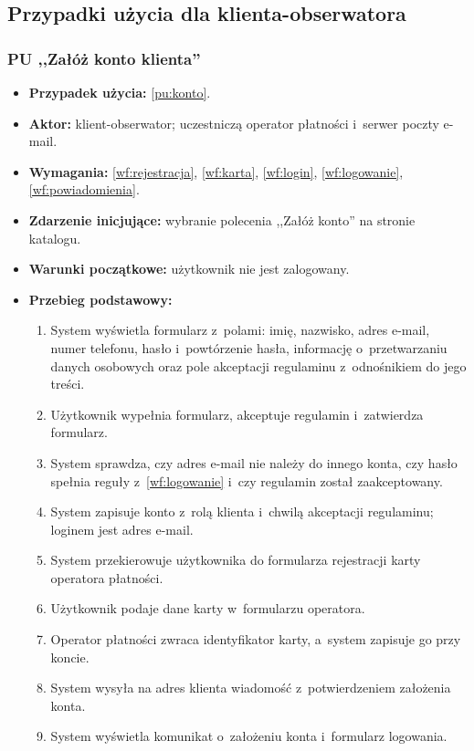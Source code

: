 \documentclass[12pt,a4paper,oneside]{article}
\newcounter{pu}
\begin{document}
\subsection{Przypadki użycia dla klienta-obserwatora}
\label{sec:pu-obserwator}

\subsubsection{PU ,,Załóż konto klienta''}
\label{sec:pu-konto}

\begin{itemize}
	\item \textbf{Przypadek użycia:} \ref{pu:konto}.
	\item \textbf{Aktor:} klient-obserwator; uczestniczą operator płatności i~serwer poczty e-mail.
	\item \textbf{Wymagania:} \ref{wf:rejestracja}, \ref{wf:karta}, \ref{wf:login}, \ref{wf:logowanie}, \ref{wf:powiadomienia}.
	\item \textbf{Zdarzenie inicjujące:} wybranie polecenia ,,Załóż konto'' na stronie katalogu.
	\item \textbf{Warunki początkowe:} użytkownik nie jest zalogowany.
	\item \textbf{Przebieg podstawowy:}
	\begin{enumerate}
		\item System wyświetla formularz z~polami: imię, nazwisko, adres e-mail, numer telefonu, hasło i~powtórzenie hasła, informację o~przetwarzaniu danych osobowych oraz pole akceptacji regulaminu z~odnośnikiem do jego treści.
		\item Użytkownik wypełnia formularz, akceptuje regulamin i~zatwierdza formularz.
		\item System sprawdza, czy adres e-mail nie należy do innego konta, czy hasło spełnia reguły z~\ref{wf:logowanie} i~czy regulamin został zaakceptowany.
		\item System zapisuje konto z~rolą klienta i~chwilą akceptacji regulaminu; loginem jest adres e-mail.
		\item System przekierowuje użytkownika do formularza rejestracji karty operatora płatności.
		\item Użytkownik podaje dane karty w~formularzu operatora.
		\item Operator płatności zwraca identyfikator karty, a~system zapisuje go przy koncie.
		\item System wysyła na adres klienta wiadomość z~potwierdzeniem założenia konta.
		\item System wyświetla komunikat o~założeniu konta i~formularz logowania.

\end{enumerate}
\end{itemize}
\end{document}
